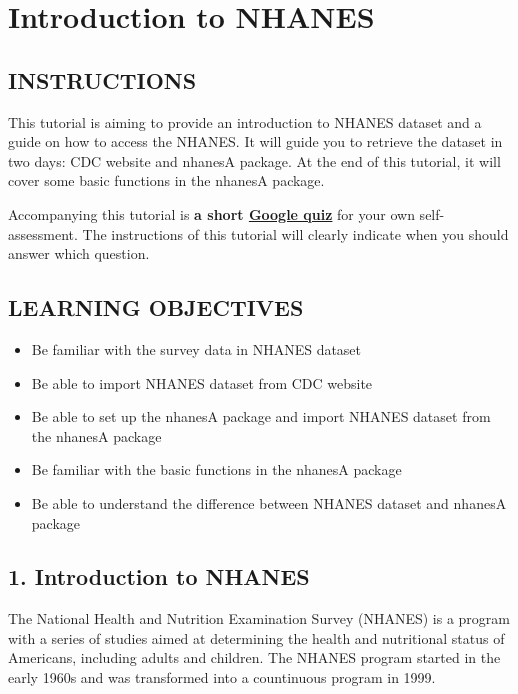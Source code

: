 \documentclass[
]{book}
\begin{document}
\hypertarget{introduction-to-nhanes}{%
\chapter{Introduction to NHANES}\label{introduction-to-nhanes}}

\hypertarget{instructions-3}{%
\section{INSTRUCTIONS}\label{instructions-3}}

This tutorial is aiming to provide an introduction to NHANES dataset and a guide on how to access the NHANES. It will guide you to retrieve the dataset in two days: CDC website and nhanesA package. At the end of this tutorial, it will cover some basic functions in the nhanesA package.

Accompanying this tutorial is \textbf{a short \href{https://forms.gle/zhMbsduL8xYjnmXg6}{Google quiz}} for your own self-assessment. The instructions of this tutorial will clearly indicate when you should answer which question.

\hypertarget{learning-objectives-3}{%
\section{LEARNING OBJECTIVES}\label{learning-objectives-3}}

\begin{itemize}
\item
  Be familiar with the survey data in NHANES dataset
\item
  Be able to import NHANES dataset from CDC website
\item
  Be able to set up the nhanesA package and import NHANES dataset from the nhanesA package
\item
  Be familiar with the basic functions in the nhanesA package
\item
  Be able to understand the difference between NHANES dataset and nhanesA package
\end{itemize}

\hypertarget{introduction-to-nhanes-1}{%
\section{1. Introduction to NHANES}\label{introduction-to-nhanes-1}}

The National Health and Nutrition Examination Survey (NHANES) is a program with a series of studies aimed at determining the health and nutritional status of Americans, including adults and children. The NHANES program started in the early 1960s and was transformed into a countinuous program in 1999.
\end{document}
